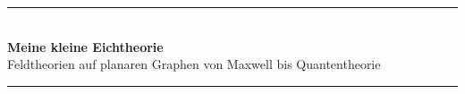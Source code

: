 \documentclass[11pt,a4paper,leqno]{report}
\numberwithin{equation}{chapter}
\renewcommand{\contentsname}{Inhaltsverzeichnis}
\begin{document}
\begin{titlepage}
	\vspace*{5cm}
	\begin{center}
		\rule{\linewidth}{0.5mm} \\[0.7cm]
		
		{\Huge \bfseries Meine kleine Eichtheorie} \\[0.35cm]
		{\normalsize Feldtheorien auf planaren Graphen von Maxwell bis Quantentheorie} \\[0.7cm]
		
		\rule{\linewidth}{0.5mm} \\[4cm]
	\end{center}
\end{titlepage}




\tableofcontents


\vfill
\end{document}
